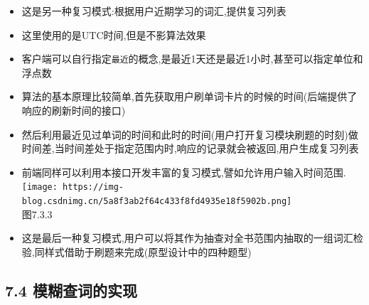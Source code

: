 \documentclass[
]{article}
\begin{document}
\begin{itemize}
\item
  这是另一种复习模式:根据用户近期学习的词汇,提供复习列表
\item
  这里使用的是UTC时间,但是不影算法效果
\item
  客户端可以自行指定\texttt{最近}的概念,是最近1天还是最近1小时,甚至可以指定单位和浮点数
\item
  算法的基本原理比较简单,首先获取用户刷单词卡片的时候的时间(后端提供了响应的刷新时间的接口)
\item
  然后利用最近见过单词的时间和此时的时间(用户打开复习模块刷题的时刻)做时间差,当时间差处于指定范围内时,响应的记录就会被返回,用户生成复习列表
\item
  前端同样可以利用本接口开发丰富的复习模式,譬如允许用户输入时间范围.\\
  \texttt{[image: https://img-blog.csdnimg.cn/5a8f3ab2f64c433f8fd4935e18f5902b.png]}\\
  图7.3.3
\end{itemize}

\begin{itemize}
\item
  这是最后一种复习模式,用户可以将其作为抽查对全书范围内抽取的一组词汇检验,同样式借助于刷题来完成(原型设计中的四种题型)
\end{itemize}

\hypertarget{74-ux6a21ux7ccaux67e5ux8bcdux7684ux5b9eux73b0}{%
\subsection{7.4
模糊查词的实现}\label{74-ux6a21ux7ccaux67e5ux8bcdux7684ux5b9eux73b0}}
\end{document}
